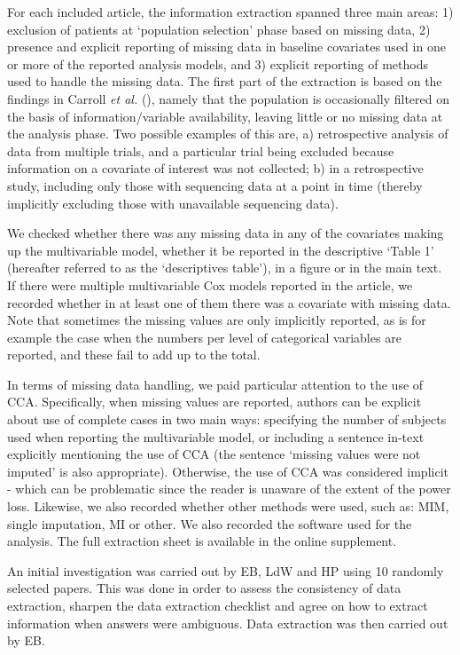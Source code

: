 \documentclass[
  letterpaper,
  DIV=11,
  numbers=noendperiod]{scrreprt}
\begin{document}
For each included article, the information extraction spanned three main
areas: 1) exclusion of patients at `population selection' phase based on
missing data, 2) presence and explicit reporting of missing data in
baseline covariates used in one or more of the reported analysis models,
and 3) explicit reporting of methods used to handle the missing data.
The first part of the extraction is based on the findings in Carroll
\emph{et al.} (), namely
that the population is occasionally filtered on the basis of
information/variable availability, leaving little or no missing data at
the analysis phase. Two possible examples of this are, a) retrospective
analysis of data from multiple trials, and a particular trial being
excluded because information on a covariate of interest was not
collected; b) in a retrospective study, including only those with
sequencing data at a point in time (thereby implicitly excluding those
with unavailable sequencing data).

We checked whether there was any missing data in any of the covariates
making up the multivariable model, whether it be reported in the
descriptive `Table 1' (hereafter referred to as the `descriptives
table'), in a figure or in the main text. If there were multiple
multivariable Cox models reported in the article, we recorded whether in
at least one of them there was a covariate with missing data. Note that
sometimes the missing values are only implicitly reported, as is for
example the case when the numbers per level of categorical variables are
reported, and these fail to add up to the total.

In terms of missing data handling, we paid particular attention to the
use of CCA. Specifically, when missing values are reported, authors can
be explicit about use of complete cases in two main ways: specifying the
number of subjects used when reporting the multivariable model, or
including a sentence in-text explicitly mentioning the use of CCA (the
sentence `missing values were not imputed' is also appropriate).
Otherwise, the use of CCA was considered implicit - which can be
problematic since the reader is unaware of the extent of the power loss.
Likewise, we also recorded whether other methods were used, such as:
MIM, single imputation, MI or other. We also recorded the software used
for the analysis. The full extraction sheet is available in the online
supplement.

An initial investigation was carried out by EB, LdW and HP using 10
randomly selected papers. This was done in order to assess the
consistency of data extraction, sharpen the data extraction checklist
and agree on how to extract information when answers were ambiguous.
Data extraction was then carried out by EB.
\end{document}
